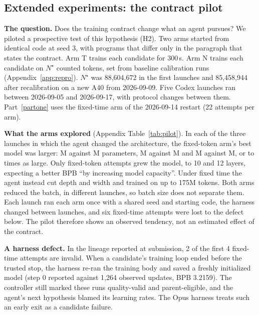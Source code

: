 \documentclass{article}
\newif\ifshowhumanmarkers \showhumanmarkersfalse
\newcommand{\humantag}[1]{{\color{humanframe}\sffamily\scriptsize\bfseries HUMAN AUTHOR MUST REWRITE/VERIFY [#1]}\ }
\newcommand{\humanauthor}[2][]{\ifshowhumanmarkers\begin{humanbox}\humantag{#1}#2\end{humanbox}\else #2\par\fi}
\begin{document}
\subsection{Extended experiments: the contract pilot}\label{sec:pilot}
\humanauthor[P2-15 r6]{ \textbf{The question.} Does the training contract change what an agent pursues? We piloted a prospective test of this hypothesis (H2). Two arms started from identical code at seed 3, with programs that differ only in the paragraph that states the contract. Arm T trains each candidate for 300\,s. Arm N trains each candidate on $N^\star$ counted tokens, set from baseline calibration runs (Appendix~\ref{app:repro}). $N^\star$ was 88,604,672 in the first launches and 85,458,944 after recalibration on a new A40 from 2026-09-09. Five Codex launches ran between 2026-09-05 and 2026-09-17, with protocol changes between them. Part~\ref{partone} uses the fixed-time arm of the 2026-09-14 restart (22 attempts per arm).

\looseness=-1 \textbf{What the arms explored} (Appendix Table~\ref{tab:pilot}). In each of the three launches in which the agent changed the architecture, the fixed-token arm's best model was larger: \CRFivePilotNA M against \CRFivePilotTA M parameters, \CRFivePilotNB M against \CRFivePilotTB M and \CRFivePilotNC M against \CRFivePilotTC M, or \CRFivePilotRatioLo{} to \CRFivePilotRatioHi{} times as large. Only fixed-token attempts grew the model, to 10 and 12 layers, expecting a better BPB ``by increasing model capacity''. Under fixed time the agent instead cut depth and width and trained on up to 175M tokens. Both arms reduced the batch, in different launches, so batch size does not separate them. Each launch ran each arm once with a shared seed and starting code, the harness changed between launches, and six fixed-time attempts were lost to the defect below. The pilot therefore shows an observed tendency, not an estimated effect of the contract.

\looseness=-1 \textbf{A harness defect.} In the lineage reported at submission, 2 of the first 4 fixed-time attempts are invalid. When a candidate's training loop ended before the trusted stop, the harness re-ran the training body and saved a freshly initialized model (step 0 reported against 1,264 observed updates, BPB 3.2159). The controller still marked these runs quality-valid and parent-eligible, and the agent's next hypothesis blamed its learning rates. The Opus harness treats such an early exit as a candidate failure.}
\end{document}
